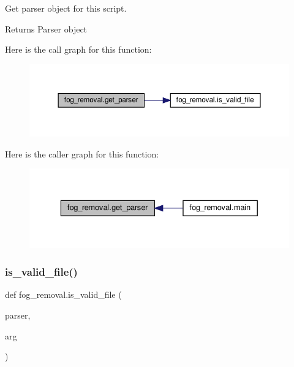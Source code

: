 Get parser object for this script. 

\begin{DoxyReturn}{Returns}
Parser object 
\end{DoxyReturn}
Here is the call graph for this function\+:
\nopagebreak
\begin{figure}[H]
\begin{center}
\leavevmode
\includegraphics[width=350pt]{namespacefog__removal_a89c98f8f9a6d048485938fc05675ce9e_cgraph}
\end{center}
\end{figure}
Here is the caller graph for this function\+:
\nopagebreak
\begin{figure}[H]
\begin{center}
\leavevmode
\includegraphics[width=329pt]{namespacefog__removal_a89c98f8f9a6d048485938fc05675ce9e_icgraph}
\end{center}
\end{figure}
\mbox{\label{namespacefog__removal_a7b07384f6a6ff8498e14f3aa5f8e2252}} 
\subsubsection{\texorpdfstring{is\+\_\+valid\+\_\+file()}{is\_valid\_file()}}
{\footnotesize\ttfamily def fog\+\_\+removal.\+is\+\_\+valid\+\_\+file (\begin{DoxyParamCaption}\item[{}]{parser,  }\item[{}]{arg }\end{DoxyParamCaption})}



